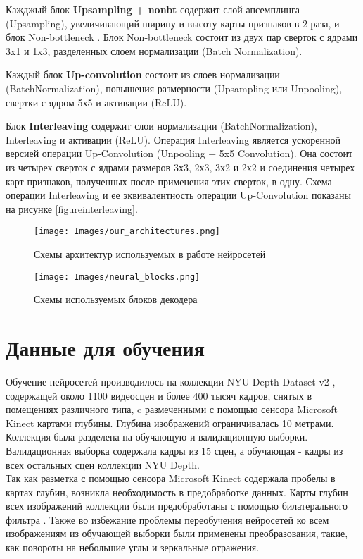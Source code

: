 \documentclass{mipt-thesis-bs}
\begin{document}
Кажджый блок \textbf{Upsampling + nonbt} содержит слой апсемплинга (Upsampling), увеличивающий ширину и высоту карты признаков в 2 раза, и блок Non-bottleneck \cite{romera2017erfnet}. Блок Non-bottleneck состоит из двух пар сверток с ядрами 3x1 и 1x3, разделенных слоем нормализации (Batch Normalization).

Каждый блок \textbf{Up-convolution} состоит из слоев нормализации (BatchNormalization), повышения размерности (Upsampling или Unpooling), свертки с ядром 5х5 и активации (ReLU). 

Блок \textbf{Interleaving} содержит слои нормализации (BatchNormalization), Interleaving \cite{laina2016deeper} и активации (ReLU). Операция Interleaving является ускоренной версией операции Up-Convolution (Unpooling + 5x5 Convolution). Она состоит из четырех сверток с ядрами размеров 3х3, 2х3, 3х2 и 2х2 и соединения четырех карт признаков, полученных после применения этих сверток, в одну. Схема операции Interleaving и ее эквивалентность операции Up-Convolution показаны на рисунке \ref{figureinterleaving}.

\begin{figure}
	\centering
	\texttt{[image: Images/our\_architectures.png]}
	\caption{Схемы архитектур используемых в работе нейросетей}
	\label{figurenetworks}
\end{figure}

\begin{figure}
	\centering
	\texttt{[image: Images/neural\_blocks.png]}
	\caption{Схемы используемых блоков декодера}
	\label{figureblocks}
\end{figure}

\section{Данные для обучения}

Обучение нейросетей производилось на коллекции NYU Depth Dataset v2 \cite{silberman2011indoor}, содержащей около 1100 видеосцен и более 400 тысяч кадров, снятых в помещениях различного типа, c размеченными с помощью сенсора Microsoft Kinect картами глубины. Глубина изображений ограничивалась 10 метрами. Коллекция была разделена на обучающую и валидационную выборки. Валидационная выборка содержала кадры из 15 сцен, а обучающая - кадры из всех остальных сцен коллекции NYU Depth.\\
Так как разметка с помощью сенсора Microsoft Kinect содержала пробелы в картах глубин, возникла необходимость в предобработке данных. Карты глубин всех изображений коллекции были предобработаны с помощью билатерального фильтра \cite{tomasi1998bilateral}. Также во избежание проблемы переобучения нейросетей ко всем изображениям из обучающей выборки были применены преобразования, такие, как повороты на небольшие углы и зеркальные отражения.
\end{document}
